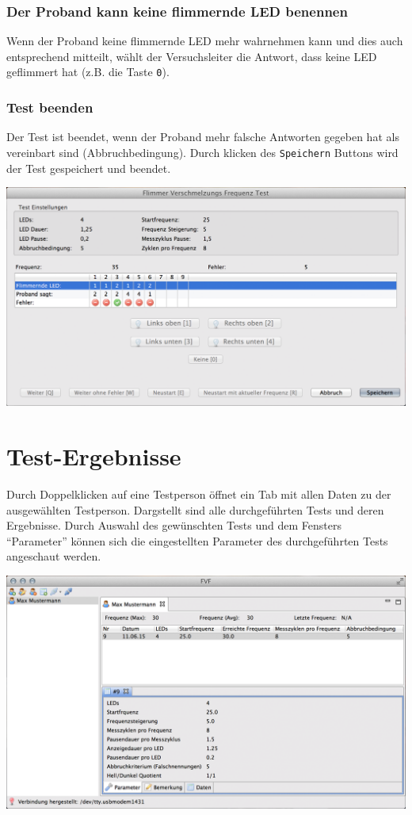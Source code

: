 \documentclass[11pt,accentcolor=tud2a,colorback,noheadingspace,bigchapter]{tudreport}
\begin{document}
\subsection{Der Proband kann keine flimmernde LED benennen}
\label{tests:der-proband-kann-keine-flimmernde-led-benennen}
Wenn der Proband keine flimmernde LED mehr wahrnehmen kann und dies auch entsprechend mitteilt, wählt der Versuchsleiter die Antwort, dass keine LED geflimmert hat (z.B. die Taste \texttt{0}).


\subsection{Test beenden}
\label{tests:test-beenden}
Der Test ist beendet, wenn der Proband mehr falsche Antworten gegeben hat als vereinbart sind (Abbruchbedingung). Durch klicken des \texttt{Speichern} Buttons wird der Test gespeichert und beendet.

\includegraphics[width=\textwidth]{testrunner_finished.png}


\chapter{Test-Ergebnisse}
\label{results:test-ergebnisse}\label{results::doc}
Durch Doppelklicken auf eine Testperson öffnet ein Tab mit allen Daten zu der ausgewählten Testperson.
Dargstellt sind alle durchgeführten Tests und deren Ergebnisse. Durch Auswahl des gewünschten Tests und dem Fensters ``Parameter'' können sich die eingestellten Parameter des durchgeführten Tests angeschaut werden.

\includegraphics[width=\textwidth]{results_parameter.png}
\end{document}
